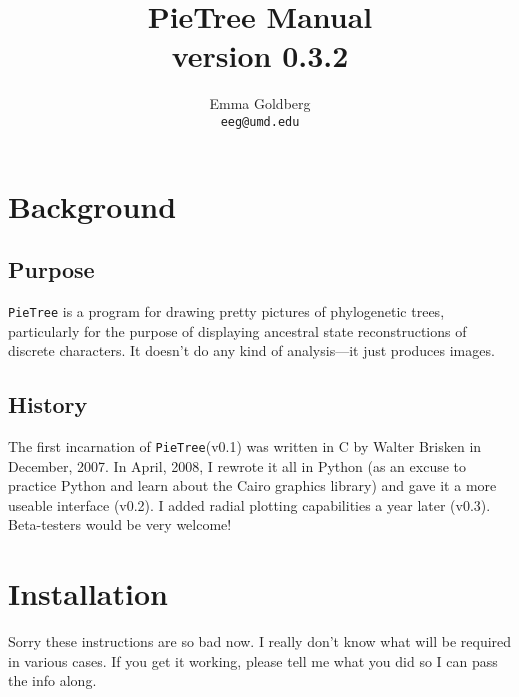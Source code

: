 \documentclass[10pt]{article}
\newcommand{\PT}{\texttt{PieTree}\xspace}
\begin{document}
\title{
	\vspace{-20pt}
	\Large{ {\bf PieTree} Manual} \\
	\large{ version 0.3.2 }  %
}
\author{
	\large{Emma Goldberg} \\
	\large{\texttt{eeg@umd.edu}}  %
}
\maketitle


\tableofcontents


\section*{Background}

\subsection*{Purpose}

\PT is a program for drawing pretty pictures of phylogenetic trees, particularly for the purpose of displaying ancestral state reconstructions of discrete characters.
It doesn't do any kind of analysis---it just produces images.

\subsection*{History}

The first incarnation of \PT (v0.1) was written in C by Walter Brisken in December, 2007.
In April, 2008, I rewrote it all in Python (as an excuse to practice Python and learn about the Cairo graphics library) and gave it a more useable interface (v0.2).
I added radial plotting capabilities a year later (v0.3).
Beta-testers would be very welcome!


\section*{Installation}

Sorry these instructions are so bad now. 
I really don't know what will be required in various cases.
If you get it working, please tell me what you did so I can pass the info along.
\end{document}
